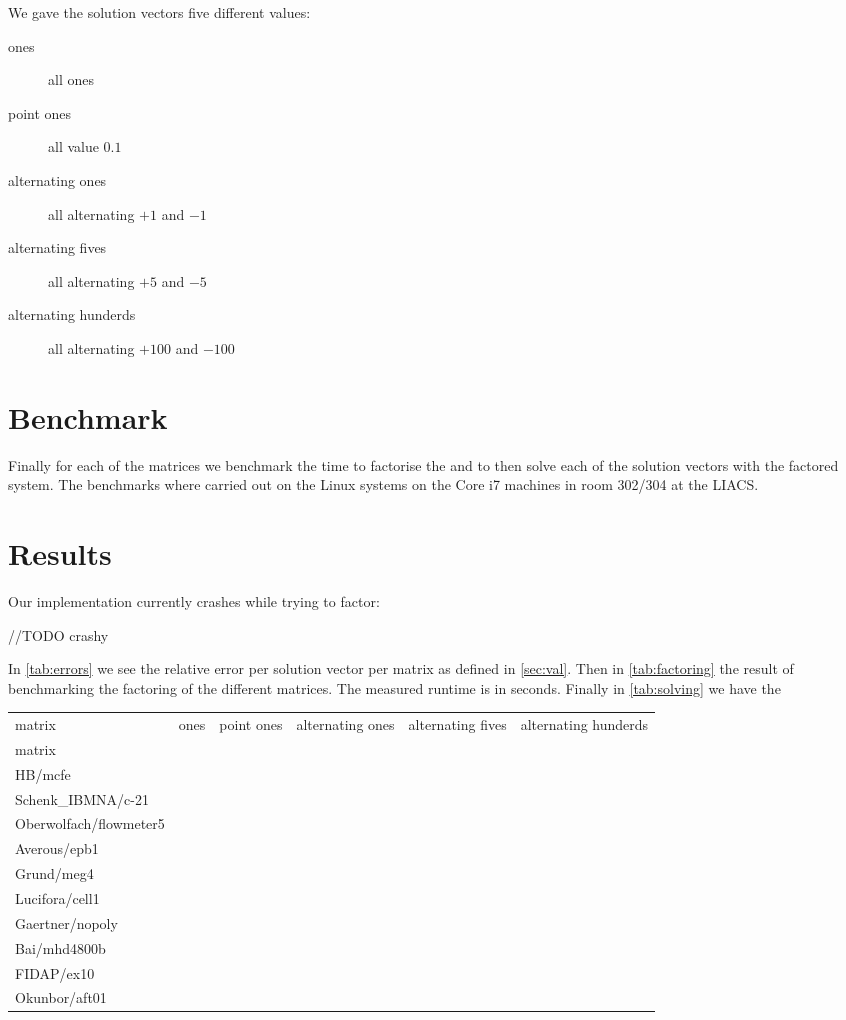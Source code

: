 \documentclass[10pt]{article}
\begin{document}
We gave the solution vectors five different values:

\begin{description}
    \item [ones] all ones
    \item [point ones] all value $0.1$
    \item [alternating ones] all alternating $+1$ and $-1$
    \item [alternating fives] all alternating $+5$ and $-5$
    \item [alternating hunderds] all alternating $+100$ and $-100$
\end{description}

\section{Benchmark}
Finally for each of the matrices we benchmark the time to factorise the and to then solve each of the solution vectors with the factored system. The benchmarks where carried out on the Linux systems on the Core i7 machines in room 302/304 at the LIACS.

\section{Results}
Our implementation currently crashes while trying to factor:

//TODO crashy

In \autoref{tab:errors} we see the relative error per solution vector per matrix as defined in \autoref{sec:val}. Then in \autoref{tab:factoring} the result of benchmarking the factoring of the different matrices. The measured runtime is in seconds. Finally in \autoref{tab:solving} we have the 

\begin{table}
    \begin{tabular}{ l | c | c | c | c | c }
    matrix & ones & point ones & alternating ones & alternating fives & alternating hunderds \\
    matrix &  &  &  &  &  \\
    HB/mcfe &  &  &  &  &  \\
    Schenk\_IBMNA/c-21 &  &  &  &  &  \\
    Oberwolfach/flowmeter5 &  &  &  &  &  \\
    Averous/epb1 &  &  &  &  &  \\
    Grund/meg4 &  &  &  &  &  \\
    Lucifora/cell1 &  &  &  &  &  \\
    Gaertner/nopoly &  &  &  &  &  \\
    Bai/mhd4800b &  &  &  &  &  \\
    FIDAP/ex10 &  &  &  &  &  \\
    Okunbor/aft01 &  &  &  &  &  \\
    \end{tabular}
    \label{tab:errors}
\end{table}
\end{document}
